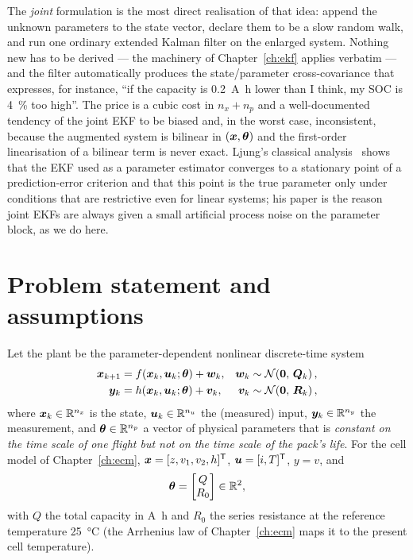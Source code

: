 The \emph{joint} formulation is the most direct realisation of that idea: append the unknown
parameters to the state vector, declare them to be a slow random walk, and run one ordinary
extended Kalman filter on the enlarged system.  Nothing new has to be derived --- the machinery of
Chapter~\ref{ch:ekf} applies verbatim --- and the filter automatically produces the
state/parameter cross-covariance that expresses, for instance, ``if the capacity is \SI{0.2}{\ampere\hour}
lower than I think, my SOC is \SI{4}{\percent} too high''.  The price is a cubic cost in
$n_x+n_p$ and a well-documented tendency of the joint EKF to be biased and, in the worst case,
inconsistent, because the augmented system is bilinear in $(\bm{x},\bm{\theta})$ and the first-order
linearisation of a bilinear term is never exact.  Ljung's classical analysis~\cite{ljung1979ekf}
shows that the EKF used as a parameter estimator converges to a stationary point of a
prediction-error criterion and that this point is the true parameter only under conditions that are
restrictive even for linear systems; his paper is the reason joint EKFs are always given a small
artificial process noise on the parameter block, as we do here.

\section{Problem statement and assumptions}
Let the plant be the parameter-dependent nonlinear discrete-time system
\begin{align}
\bm{x}_{k+1} &= f(\bm{x}_k, \bm{u}_k;\bm{\theta}) + \bm{w}_k, & \bm{w}_k &\sim \mathcal{N}\!\left(\bm{0},\,\bm{Q}_k\right),\label{eq:je-f}\\
\bm{y}_k     &= h(\bm{x}_k, \bm{u}_k;\bm{\theta}) + \bm{v}_k, & \bm{v}_k &\sim \mathcal{N}\!\left(\bm{0},\,\bm{R}_k\right),\label{eq:je-h}
\end{align}
where $\bm{x}_k\in\mathbb{R}^{n_x}$ is the state, $\bm{u}_k\in\mathbb{R}^{n_u}$ the (measured) input,
$\bm{y}_k\in\mathbb{R}^{n_y}$ the measurement, and $\bm{\theta}\in\mathbb{R}^{n_p}$ a vector of physical parameters
that is \emph{constant on the time scale of one flight but not on the time scale of the pack's
life}.  For the cell model of Chapter~\ref{ch:ecm}, $\bm{x}=[z,v_1,v_2,h]^{\mathsf{T}}$, $\bm{u}=[i,T]^{\mathsf{T}}$,
$y=v$, and
\begin{equation}
\bm{\theta} = \begin{bmatrix}Q\\ R_0\end{bmatrix}\in\mathbb{R}^2 ,
\label{eq:je-theta}
\end{equation}
with $Q$ the total capacity in \si{\ampere\hour} and $R_0$ the series resistance at the reference
temperature \SI{25}{\celsius} (the Arrhenius law of Chapter~\ref{ch:ecm} maps it to the present
cell temperature).

